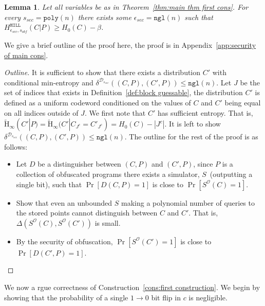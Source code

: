 \documentclass[11pt]{article}
\newcommand{\apref}[1]{\mbox{Appendix~\ref{#1}}}
\newcommand{\thref}[1]{\mbox{Theorem~\ref{#1}}}
\newcommand{\defref}[1]{\mbox{Definition~\ref{#1}}}
\newcommand{\consref}[1]{\mbox{Construction~\ref{#1}}}
\newcommand{\dis}{\ensuremath{\mathsf{dis}}}
\newcommand{\hill}{\ensuremath{\mathtt{HILL}}\xspace}
\newcommand{\poly}{\ensuremath{\mathtt{poly}}\xspace}
\newcommand{\ngl}{\ensuremath{\mathtt{ngl}}\xspace}
\newcommand{\Hav}{\tilde{\mathrm{H}}_\infty}
\newtheorem{lemma}[theorem]{Lemma}
\begin{document}
\begin{lemma}
\label{lem:security of cons}
Let all variables be as in \thref{thm:main thm first cons}.  For every $s_{sec} = \poly(n)$ there exists some $\epsilon_{sec} = \ngl(n)$ such that $H^{\hill}_{\epsilon_{sec}, s_{obf}}( C | P ) \geq H_0(C) - \beta$.%
\end{lemma}

We give a brief outline of the proof here, the proof is in \apref{app:security of main cons}.
\begin{proof}[Outline]
It is sufficient to show that there exists a distribution $C'$ with conditional min-entropy and $\delta^{\mathcal{D}_{s_{sec}}}((C, P), (C', P))\le \ngl(n)$.  Let $J$ be the set of indices that exists in \defref{def:block guessable}, the distribution $C'$ is defined as a uniform codeword conditioned on the values of $C$ and $C'$ being equal on all indices outside of $J$.  We first note that $C'$ has sufficient entropy.  That is, $\Hav(C' |P) =\Hav(C' | C_{J^c} = C'_{J^c}) = H_0(C) - |J^c|$.  It is left to show $\delta^{\mathcal{D}_{s_{sec}}}((C, P), (C', P)) \le \ngl(n)$.
The outline for the rest of the proof is as follows:
\begin{itemize}
\item Let $D$ be a distinguisher between $(C, P)$ and $(C', P)$, since $P$ is a collection of obfuscated programs there exists a simulator, $S$~(outputting a single bit), such that $\Pr[D(C, P)=1]$ is close to $\Pr[S^{\mathcal{O}}(C)=1]$.
\item Show that even an unbounded $S$ making a polynomial number of queries to the stored points cannot distinguish between $C$ and $C'$.  That is, $\Delta(S^{\mathcal{O}}(C),S^{\mathcal{O}}(C'))$ is small.
\item By the security of obfuscation, $\Pr[S^{\mathcal{O}}(C')=1]$ is close to $\Pr[D(C', P)=1]$.
\end{itemize}
\end{proof}
We now a rgue correctness of \consref{cons:first construction}.
We begin by showing that the probability of a single $1\rightarrow 0$ bit flip in $c$ is negligible.
\end{document}
